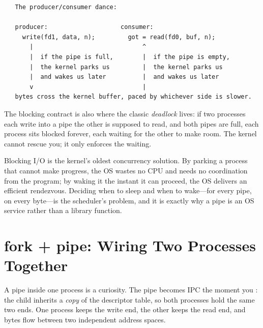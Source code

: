 \begin{verbatim}
   The producer/consumer dance:

   producer:                    consumer:
     write(fd1, data, n);         got = read(fd0, buf, n);
       |                              ^
       |  if the pipe is full,        |  if the pipe is empty,
       |  the kernel parks us         |  the kernel parks us
       |  and wakes us later          |  and wakes us later
       v                              |
   bytes cross the kernel buffer, paced by whichever side is slower.
\end{verbatim}

The blocking contract is also where the classic \emph{deadlock} lives:
if two processes each write into a pipe the other is supposed to read,
and both pipes are full, each process sits blocked forever, each
waiting for the other to make room. The kernel cannot rescue you; it
only enforces the waiting.

\begin{osconcept}
Blocking I/O is the kernel's oldest concurrency solution. By parking a
process that cannot make progress, the OS wastes no CPU and needs no
coordination from the program; by waking it the instant it can proceed,
the OS delivers an efficient rendezvous. Deciding when to sleep and
when to wake---for every pipe, on every byte---is the scheduler's
problem, and it is exactly why a pipe is an OS service rather than a
library function.
\end{osconcept}

\section{fork + pipe: Wiring Two Processes Together}

A pipe inside one process is a curiosity. The pipe becomes IPC the
moment you : the child inherits a \emph{copy} of the
descriptor table, so both processes hold the same two ends. One process
keeps the write end, the other keeps the read end, and bytes flow
between two independent address spaces.

